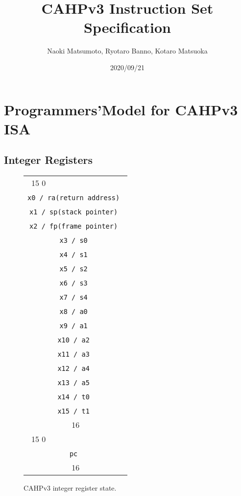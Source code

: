 \documentclass[a4paper,10pt]{article}
\title{CAHPv3 Instruction Set Specification}
\author{Naoki Matsumoto, Ryotaro Banno, Kotaro Matsuoka}
\date{2020/09/21}
\newcommand{\instbit}[1]{\mbox{\scriptsize #1}}
\newcommand{\instbitrange}[2]{~\instbit{#1} \hfill \instbit{#2}~}
\newcommand{\reglabel}[1]{\hfill {\tt #1}\hfill\ }
\begin{document}
\maketitle
\clearpage

\section{Programmers’Model for CAHPv3 ISA}
\subsection{Integer Registers}
\begin{figure}[H]
    {\footnotesize
    \begin{center}
    \begin{tabular}{p{2in}}
    \instbitrange{15}{0} \\ \cline{1-1}
    \multicolumn{1}{|c|}{\reglabel{x0 / ra(return address)}} \\ \cline{1-1}
    \multicolumn{1}{|c|}{\reglabel{x1 / sp(stack pointer)}}  \\ \cline{1-1}
    \multicolumn{1}{|c|}{\reglabel{x2 / fp(frame pointer)}}  \\ \cline{1-1}
    \multicolumn{1}{|c|}{\reglabel{x3 / s0}} \\ \cline{1-1}
    \multicolumn{1}{|c|}{\reglabel{x4 / s1}} \\ \cline{1-1}
    \multicolumn{1}{|c|}{\reglabel{x5 / s2}} \\ \cline{1-1}
    \multicolumn{1}{|c|}{\reglabel{x6 / s3}} \\ \cline{1-1}
    \multicolumn{1}{|c|}{\reglabel{x7 / s4}} \\ \cline{1-1}
    \multicolumn{1}{|c|}{\reglabel{x8 / a0}} \\ \cline{1-1}
    \multicolumn{1}{|c|}{\reglabel{x9 / a1}} \\ \cline{1-1}
    \multicolumn{1}{|c|}{\reglabel{x10 / a2}} \\ \cline{1-1}
    \multicolumn{1}{|c|}{\reglabel{x11 / a3}} \\ \cline{1-1}
    \multicolumn{1}{|c|}{\reglabel{x12 / a4}} \\ \cline{1-1}
    \multicolumn{1}{|c|}{\reglabel{x13 / a5}} \\ \cline{1-1}
    \multicolumn{1}{|c|}{\reglabel{x14 / t0}} \\ \cline{1-1}
    \multicolumn{1}{|c|}{\reglabel{x15 / t1}} \\ \cline{1-1}
    \multicolumn{1}{c}{16} \\
    
    \instbitrange{15}{0} \\ \cline{1-1}
    \multicolumn{1}{|c|}{\reglabel{pc}} \\ \cline{1-1}
    \multicolumn{1}{c}{16} \\
    \end{tabular}
    \end{center}
    }
    \caption{CAHPv3 integer register state.}
    \label{gprs}
\end{figure}
\end{document}

